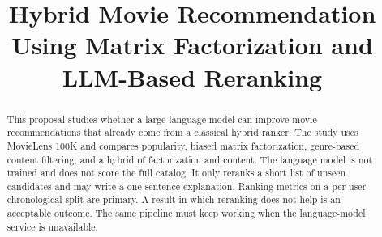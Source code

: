 \documentclass[conference]{IEEEtran}
\begin{document}
\title{Hybrid Movie Recommendation Using Matrix Factorization and LLM-Based Reranking}

\author{
\and
{}
\and
{}
\and
{}
\and
{}
}

\maketitle

\begin{abstract}
This proposal studies whether a large language model can improve movie recommendations that already come from a classical hybrid ranker. The study uses MovieLens 100K and compares popularity, biased matrix factorization, genre-based content filtering, and a hybrid of factorization and content. The language model is not trained and does not score the full catalog. It only reranks a short list of unseen candidates and may write a one-sentence explanation. Ranking metrics on a per-user chronological split are primary. A result in which reranking does not help is an acceptable outcome. The same pipeline must keep working when the language-model service is unavailable.
\end{abstract}
\end{document}
